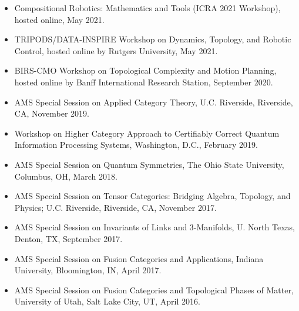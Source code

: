 \documentclass[11pt]{article}
\begin{document}
  \begin{itemize}
   \item[] Compositional Robotics: Mathematics and Tools (ICRA 2021 Workshop),  hosted online, May 2021.
    
  \item[] TRIPODS/DATA-INSPIRE Workshop on Dynamics, Topology, and Robotic Control, hosted online by Rutgers University, May 2021.

    \item[] BIRS-CMO Workshop on Topological Complexity and Motion Planning, hosted online by Banff International Research Station, September 2020.

    \item[] AMS Special Session on Applied Category Theory, U.C. Riverside, Riverside, CA, November 2019.
    
    \item[] Workshop on Higher Category Approach to Certifiably Correct Quantum Information Processing Systems, Washington, D.C., February 2019.
    
    \item[] AMS Special Session on Quantum Symmetries, The Ohio State University, Columbus, OH, March 2018.
    
    \item[] AMS Special Session on Tensor Categories: Bridging Algebra, Topology, and Physics; U.C. Riverside, Riverside, CA, November 2017.

    \item[] AMS Special Session on Invariants of Links and 3-Manifolds, U. North Texas, Denton, TX, September 2017.

    \item[] AMS Special Session on Fusion Categories and Applications, Indiana University, Bloomington, IN, April 2017.

    \item[] AMS Special Session on Fusion Categories and Topological Phases of Matter, University of Utah, Salt Lake City, UT, April 2016.
  \end{itemize}
  
\end{document}

